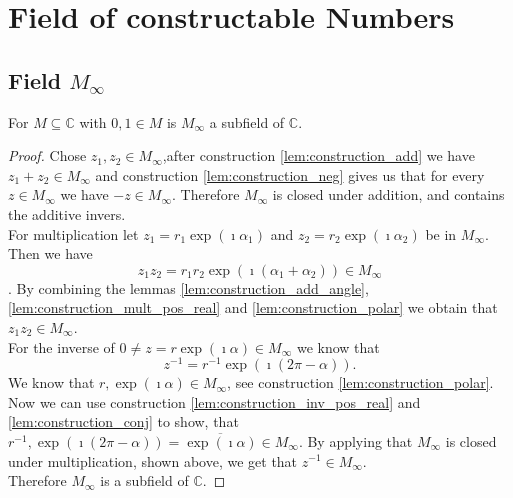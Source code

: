 \chapter{Field of constructable Numbers}
\section[Filed of Constructable Numbers]{Field $M_{\infty}$}
\begin{theorem}
    \label{THM:M_inf_subfield_C}
    For $M\subseteq \mathbb{C}$ with $0,1 \in M$ is $M_{\infty}$ a subfield of $\mathbb{C}$.
\end{theorem}
\begin{proof}
    Chose $z_1, z_2 \in M_{\infty}$,after construction \ref{lem:construction_add}
    we have $z_1 + z_2 \in M_{\infty}$ and construction \ref{lem:construction_neg}
    gives us that for every $z \in M_{\infty}$ we have $-z \in M_{\infty}$. Therefore $M_{\infty}$ is closed under addition, and contains the additive invers.\\
    For multiplication let $z_1 = r_1 \exp(\imath \alpha_1)$ and $z_2 = r_2 \exp(\imath \alpha_2)$ be in $M_{\infty}$. Then we have 
    $$z_1 z_2 = r_1 r_2 \exp(\imath (\alpha_1 + \alpha_2)) \in M_{\infty}$$. By combining the lemmas \ref{lem:construction_add_angle}, \ref{lem:construction_mult_pos_real} and \ref{lem:construction_polar}
    we obtain that $z_1 z_2 \in M_{\infty}$.\\
    For the inverse of $0 \ne z = r \exp(\imath \alpha) \in M_{\infty}$ we know that $$z^{-1} = r^{-1} \exp(\imath(2\pi - \alpha)).$$ We know that $r, \exp(\imath \alpha) \in M_{\infty}$, see construction \ref{lem:construction_polar}.
    Now we can use construction \ref{lem:construction_inv_pos_real} and \ref{lem:construction_conj} to show,
    that $r^{-1}, \exp(\imath(2\pi - \alpha)) = \overline{\exp(\imath\alpha)} \in M_{\infty}$. By applying that $M_{\infty}$ is closed under multiplication, shown above, we get that $z^{-1} \in M_{\infty}$.\\
    Therefore $M_{\infty}$ is a subfield of $\mathbb{C}$.
\end{proof}

